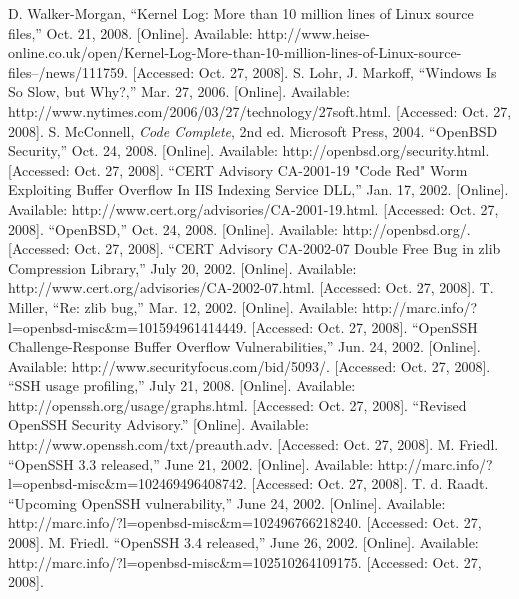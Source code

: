 \documentclass[12pt]{article}
\begin{document}
\begin{thebibliography}{99}

 D. Walker-Morgan, ``Kernel Log: More than 10 million lines of Linux source files,'' Oct. 21, 2008. [Online]. Available: http://www.heise-online.co.uk/open/Kernel-Log-More-than-10-million-lines-of-Linux-source-files--/news/111759. [Accessed: Oct. 27, 2008].
 S. Lohr, J. Markoff, ``Windows Is So Slow, but Why?,'' Mar. 27, 2006. [Online]. Available: http://www.nytimes.com/2006/03/27/technology/27soft.html. [Accessed: Oct. 27, 2008].
 S. McConnell, \textit{Code Complete}, 2nd ed. Microsoft Press, 2004.
 ``OpenBSD Security,'' Oct. 24, 2008. [Online]. Available: http://openbsd.org/security.html. [Accessed: Oct. 27, 2008].
 ``CERT Advisory CA-2001-19 "Code Red" Worm Exploiting Buffer Overflow In IIS Indexing Service DLL,'' Jan. 17, 2002. [Online]. Available: http://www.cert.org/advisories/CA-2001-19.html. [Accessed: Oct. 27, 2008].
 ``OpenBSD,'' Oct. 24, 2008. [Online]. Available: http://openbsd.org/. [Accessed: Oct. 27, 2008].
 ``CERT Advisory CA-2002-07 Double Free Bug in zlib Compression Library,'' July 20, 2002. [Online]. Available: http://www.cert.org/advisories/CA-2002-07.html. [Accessed: Oct. 27, 2008].
 T. Miller, ``Re: zlib bug,'' Mar. 12, 2002. [Online]. Available: http://marc.info/?l=openbsd-misc\&m=101594961414449. [Accessed: Oct. 27, 2008].
 ``OpenSSH Challenge-Response Buffer Overflow Vulnerabilities,'' Jun. 24, 2002. [Online]. Available: http://www.securityfocus.com/bid/5093/. [Accessed: Oct. 27, 2008].
 ``SSH usage profiling,'' July 21, 2008. [Online]. Available: http://openssh.org/usage/graphs.html. [Accessed: Oct. 27, 2008].
 ``Revised OpenSSH Security Advisory.'' [Online]. Available: http://www.openssh.com/txt/preauth.adv. [Accessed: Oct. 27, 2008].
 M. Friedl. ``OpenSSH 3.3 released,'' June 21, 2002. [Online]. Available: http://marc.info/?l=openbsd-misc\&m=102469496408742. [Accessed: Oct. 27, 2008].
 T. d. Raadt. ``Upcoming OpenSSH vulnerability,'' June 24, 2002. [Online]. Available: http://marc.info/?l=openbsd-misc\&m=102496766218240. [Accessed: Oct. 27, 2008].
 M. Friedl. ``OpenSSH 3.4 released,'' June 26, 2002. [Online]. Available: http://marc.info/?l=openbsd-misc\&m=102510264109175. [Accessed: Oct. 27, 2008].

\end{thebibliography}
\end{document}
